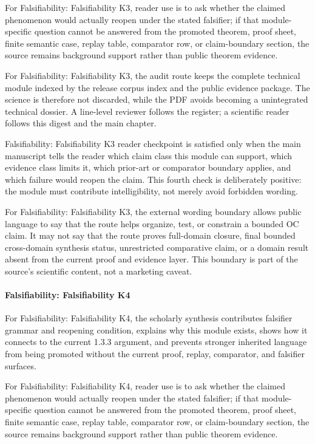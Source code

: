 For Falsifiability: Falsifiability K3, reader use is to ask whether the claimed phenomenon would actually reopen under the stated falsifier; if that module-specific question cannot be answered from the promoted theorem, proof sheet, finite semantic case, replay table, comparator row, or claim-boundary section, the source remains background support rather than public theorem evidence.


For Falsifiability: Falsifiability K3, the audit route keeps the complete technical module indexed by the release corpus index and the public evidence package. The science is therefore not discarded, while the PDF avoids becoming a unintegrated technical dossier. A line-level reviewer follows the register; a scientific reader follows this digest and the main chapter.


Falsifiability: Falsifiability K3 reader checkpoint is satisfied only when the main manuscript tells the reader which claim class this module can support, which evidence class limits it, which prior-art or comparator boundary applies, and which failure would reopen the claim. This fourth check is deliberately positive: the module must contribute intelligibility, not merely avoid forbidden wording.


For Falsifiability: Falsifiability K3, the external wording boundary allows public language to say that the route helps organize, test, or constrain a bounded OC claim. It may not say that the route proves full-domain closure, final bounded cross-domain synthesis status, unrestricted comparative claim, or a domain result absent from the current proof and evidence layer. This boundary is part of the source's scientific content, not a marketing caveat.


\paragraph{Falsifiability: Falsifiability K4}

For Falsifiability: Falsifiability K4, the scholarly synthesis contributes falsifier grammar and reopening condition, explains why this module exists, shows how it connects to the current 1.3.3 argument, and prevents stronger inherited language from being promoted without the current proof, replay, comparator, and falsifier surfaces.


For Falsifiability: Falsifiability K4, reader use is to ask whether the claimed phenomenon would actually reopen under the stated falsifier; if that module-specific question cannot be answered from the promoted theorem, proof sheet, finite semantic case, replay table, comparator row, or claim-boundary section, the source remains background support rather than public theorem evidence.


